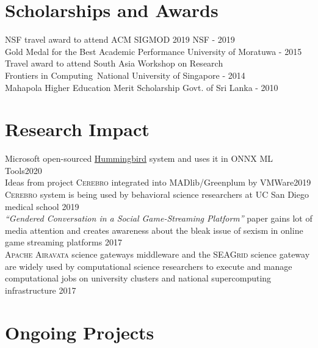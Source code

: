 \documentclass[margin]{res}
\begin{document}
\begin{resume}
\section{Scholarships and Awards}
NSF travel award to attend ACM SIGMOD 2019 \hfill NSF - 2019
\\
Gold Medal for the Best Academic Performance \hfill University of Moratuwa - 2015
\\
Travel award to attend South Asia Workshop on Research\\ Frontiers in Computing~\hfill National University of Singapore - 2014
\\
Mahapola Higher Education Merit Scholarship \hfill Govt. of Sri Lanka - 2010


\section{Research Impact}
Microsoft open-sourced \href{https://github.com/microsoft/hummingbird}{Hummingbird} system and uses it in ONNX ML Tools\hfill 2020\\
Ideas from project \textsc{Cerebro} integrated into MADlib/Greenplum by VMWare\hfill 2019\\
\textsc{Cerebro} system is being used by behavioral science researchers at UC San Diego medical school \hfill 2019\\
\textit{``Gendered Conversation in a Social Game-Streaming Platform''} paper gains lot of media attention and creates awareness about the bleak issue of sexism in online game streaming platforms \hfill 2017\\
\textsc{Apache Airavata} science gateways middleware and the \textsc{SEAGrid} science gateway are widely used by computational science researchers to execute and manage computational jobs on university clusters and national supercomputing infrastructure \hfill 2017


\vspace{2mm}
\section{Ongoing Projects}
\par


\end{resume}
\end{document}
